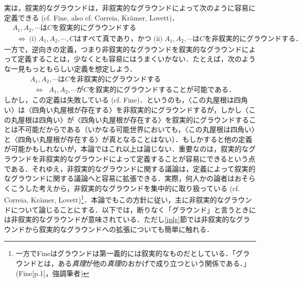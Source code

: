 \documentclass[twoside,14Q,uplatex,dvipdfmx]{jsarticle}
\theoremstyle{definition}
\begin{document}
実は，叙実的なグラウンドは，非叙実的なグラウンドによって次のように容易に定義できる (cf. Fine\cite[p.49]{Fine2012a}, also cf. Correia\cite{Correia2014,Correia2017}, Kr\"{a}mer\cite{Kramer2018,Kramer2021}, Lovett\cite{Lovett2020})．
\begin{align*}
&A_1, A_2, \cdots はCを叙実的にグラウンドする\\
&\;\;\Leftrightarrow\;\text{(i)}\;A_1, A_2, \cdots, Cはすべて真であり，かつ\;\text{(ii)}\;A_1, A_2, \cdots はCを非叙実的にグラウンドする．
\end{align*}
一方で，逆向きの定義，つまり非叙実的なグラウンドを叙実的なグラウンドによって定義することは，少なくとも容易にはうまくいかない．たとえば，次のような一見もっともらしい定義を想定しよう．
\begin{align*}
&A_1, A_2, \cdots はCを非叙実的にグラウンドする\\
&\;\;\Leftrightarrow\;\;A_1, A_2, \cdots がCを叙実的にグラウンドすることが可能である．
\end{align*}
しかし，この定義は失敗している (cf. Fine\cite[p.49]{Fine2012a})．というのも，〈この丸屋根は四角い〉は〈四角い丸屋根が存在する〉を非叙実的にグラウンドするが，しかし〈この丸屋根は四角い〉が〈四角い丸屋根が存在する〉を叙実的にグラウンドすることは不可能だからである（いかなる可能世界においても，〈この丸屋根は四角い〉と〈四角い丸屋根が存在する〉が真となることはない）．もしかすると他の定義が可能かもしれないが，本論ではこれ以上は論じない．重要なのは，叙実的なグラウンドを非叙実的なグラウンドによって定義することが容易にできるという点である．それゆえ，非叙実的なグラウンドに関する議論は，定義によって叙実的なグラウンドに関する議論へと容易に拡張できる．実際，何人かの論者はおそらくこうした考えから，非叙実的なグラウンドを集中的に取り扱っている (cf. Correia\cite{Correia2017}, Kr\"{a}mer\cite{Kramer2018,Kramer2021}, Lovett\cite{Lovett2020})\footnote{一方でFine\cite{Fine2012a,Fine2012b}はグラウンドは第一義的には叙実的なものだとしている．「グラウンドとは，ある\emph{真理}が他の\emph{真理}のおかげで成り立つという関係である．」(Fine[p.1]\cite{Fine2012b}，強調筆者)}．本論でもこの方針に従い，主に非叙実的なグラウンドについて論じることにする．以下では，断りなく「グラウンド」と言うときには非叙実的なグラウンドが意味されている．ただし\ref{iplg}節では非叙実的なグラウンドから叙実的なグラウンドへの拡張についても簡単に触れる．
\end{document}
